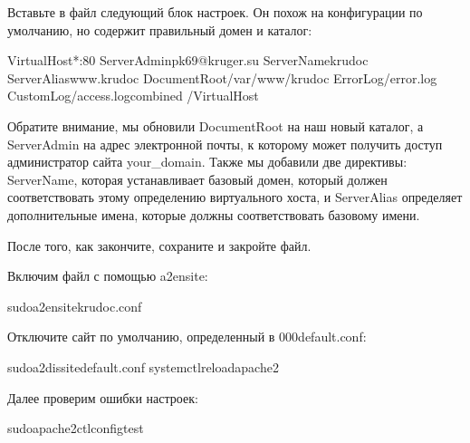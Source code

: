 \documentclass[letterpaper,10pt,russian]{sphinxmanual}
\begin{document}
\sphinxAtStartPar
Вставьте в файл следующий блок настроек. Он похож на конфигурации по умолчанию, но содержит правильный домен и каталог:

\begin{sphinxVerbatim}[commandchars=\\\{\}]
\PYGZlt{}VirtualHost*:80\PYGZgt{}
ServerAdminpk69@kruger.su
ServerNamekrudoc
ServerAliaswww.krudoc
DocumentRoot/var/www/krudoc
ErrorLog/error.log
CustomLog/access.logcombined
\PYGZlt{}/VirtualHost\PYGZgt{}
\end{sphinxVerbatim}

\sphinxAtStartPar
Обратите внимание, мы обновили DocumentRoot на наш новый каталог, а ServerAdmin на адрес электронной почты,
к которому может получить доступ администратор сайта your\_domain. Также мы добавили две директивы: ServerName,
которая устанавливает базовый домен, который должен соответствовать этому определению виртуального хоста,
и ServerAlias \textendash{} определяет дополнительные имена, которые должны соответствовать базовому имени.

\sphinxAtStartPar
После того, как закончите, сохраните и закройте файл.

\sphinxAtStartPar
Включим файл с помощью a2ensite:

\begin{sphinxVerbatim}[commandchars=\\\{\}]
\PYGZdl{}sudoa2ensitekrudoc.conf
\end{sphinxVerbatim}

\sphinxAtStartPar
Отключите сайт по умолчанию, определенный в 000\sphinxhyphen{}default.conf:

\begin{sphinxVerbatim}[commandchars=\\\{\}]
\PYGZdl{}sudoa2dissite\PYGZhy{}default.conf
\PYGZdl{}systemctlreloadapache2
\end{sphinxVerbatim}

\sphinxAtStartPar
Далее проверим ошибки настроек:

\begin{sphinxVerbatim}[commandchars=\\\{\}]
\PYGZdl{}sudoapache2ctlconfigtest
\end{sphinxVerbatim}
\end{document}
